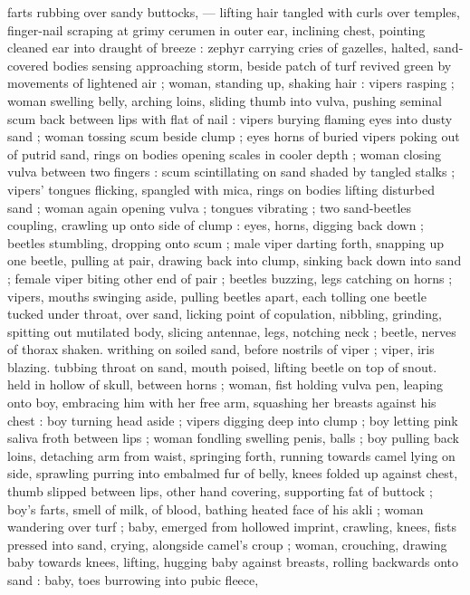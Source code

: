 farts rubbing over sandy buttocks, --- lifting hair tangled with curls 
over temples, finger-nail scraping at grimy cerumen in outer ear, 
inclining chest, pointing cleaned ear into draught of breeze : zephyr 
carrying cries of gazelles, halted, sand-covered bodies sensing 
approaching storm, beside patch of turf revived green by 
movements of lightened air ; woman, standing up, shaking hair : 
vipers rasping ; woman swelling belly, arching loins, sliding thumb 
into vulva, pushing seminal scum back between lips with flat of nail : 
vipers burying flaming eyes into dusty sand ; woman tossing scum 
beside clump ; eyes horns of buried vipers poking out of putrid 
sand, rings on bodies opening scales in cooler depth ; woman closing 
vulva between two fingers : scum scintillating on sand shaded by 
tangled stalks ; vipers' tongues flicking, spangled with mica, rings on 
bodies lifting disturbed sand ; woman again opening vulva ; tongues 
vibrating ; two sand-beetles coupling, crawling up onto side of clump 
: eyes, horns, digging back down ; beetles stumbling, dropping onto 
scum ; male viper darting forth, snapping up one beetle, pulling at 
pair, drawing back into clump, sinking back down into sand ; female 
viper biting other end of pair ; beetles buzzing, legs catching on 
horns ; vipers, mouths swinging aside, pulling beetles apart, each 
tolling one beetle tucked under throat, over sand, licking point of 
copulation, nibbling, grinding, spitting out mutilated body, slicing 
antennae, legs, notching neck ; beetle, nerves of thorax shaken. 
writhing on soiled sand, before nostrils of viper ; viper, iris blazing. 
tubbing throat on sand, mouth poised, lifting beetle on top of snout. 
held in hollow of skull, between horns ; woman, fist holding vulva 
pen, leaping onto boy, embracing him with her free arm, squashing 
her breasts against his chest : boy turning head aside ; vipers 
digging deep into clump ; boy letting pink saliva froth between lips ; 
woman fondling swelling penis, balls ; boy pulling back loins, 
detaching arm from waist, springing forth, running towards camel 
lying on side, sprawling purring into embalmed fur of belly, knees 
folded up against chest, thumb slipped between lips, other hand 
covering, supporting fat of buttock ; boy's farts, smell of milk, of 
blood, bathing heated face of his akli ; woman wandering over turf ; 
baby, emerged from hollowed imprint, crawling, knees, fists pressed 
into sand, crying, alongside camel's croup ; woman, crouching, 
drawing baby towards knees, lifting, hugging baby against breasts, 
rolling backwards onto sand : baby, toes burrowing into pubic fleece, 
